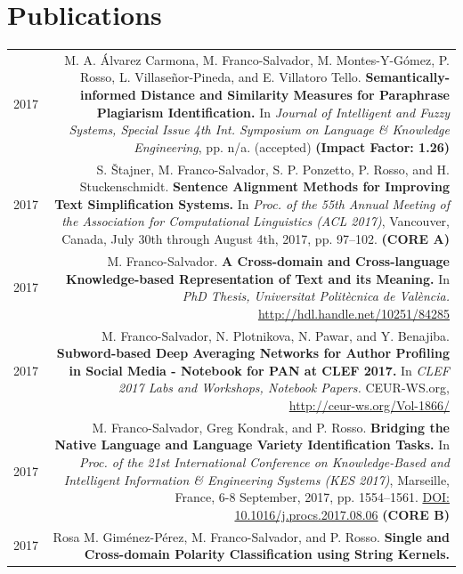 \documentclass[10pt]{article}
\begin{document}
	\section*{Publications}
	\begin{tabular}{L!{\VRule}R}
	2017&M. A. {\'A}lvarez Carmona,  M. Franco-Salvador, M. Montes-Y-G{\'o}mez, P. Rosso, L. Villase{\~n}or-Pineda, and E. Villatoro Tello. \textbf{Semantically-informed Distance and Similarity Measures for Paraphrase Plagiarism Identification.}
	In \emph{Journal of Intelligent and Fuzzy Systems, Special Issue 4th Int. Symposium on Language \& Knowledge Engineering}, pp. n/a. (accepted) \textbf{(Impact Factor: 1.26)} \vspace{5pt}\\
	2017& S. \v{S}tajner, M. Franco-Salvador, S. P. Ponzetto, P. Rosso, and H. Stuckenschmidt. \textbf{Sentence Alignment Methods for Improving Text Simplification Systems.}
	In \emph{Proc. of the 55th Annual Meeting of the Association for Computational Linguistics (ACL 2017)},  Vancouver, Canada, July 30th through August 4th, 2017, pp. 97--102. \textbf{(CORE A)}\vspace{5pt}\\
	2017& M. Franco-Salvador. \textbf{A Cross-domain and Cross-language Knowledge-based Representation of Text and its Meaning.}
	In \emph{PhD Thesis, Universitat Polit{\`e}cnica de Val{\`e}ncia.} \href{http://hdl.handle.net/10251/84285}{http://hdl.handle.net/10251/84285}\vspace{5pt}\\
	2017& M. Franco-Salvador, N. Plotnikova, N. Pawar, and Y. Benajiba. \textbf{Subword-based Deep Averaging Networks for Author Profiling in Social Media - Notebook for PAN at CLEF 2017.}
	In \emph{CLEF 2017 Labs and Workshops, Notebook Papers.} CEUR-WS.org, \href{http://ceur-ws.org/Vol-1866/}{http://ceur-ws.org/Vol-1866/}\vspace{5pt}\\
	2017&M. Franco-Salvador, Greg Kondrak, and P. Rosso. \textbf{Bridging the Native Language and Language Variety Identification Tasks.}
	In \emph{Proc. of the 21st International Conference on Knowledge-Based and Intelligent Information \& Engineering Systems (KES 2017)}, Marseille, France, 6-8 September, 2017, pp. 1554--1561. \href{https://doi.org/10.1016/j.procs.2017.08.068}{DOI: 10.1016/j.procs.2017.08.06} \textbf{(CORE B)}\vspace{5pt}\\
	2017&Rosa M. Gim{\'e}nez-P{\'e}rez, M. Franco-Salvador, and P. Rosso. \textbf{Single and Cross-domain Polarity Classification using String Kernels.}

\end{tabular}
\end{document}
